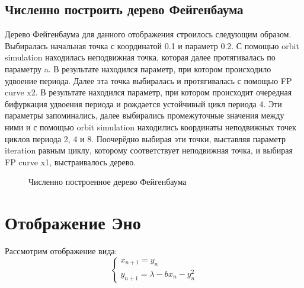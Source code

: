 \documentclass[12pt, a4paper]{article}
\begin{document}
\subsection{Численно построить дерево Фейгенбаума}
Дерево Фейгенбаума для данного отображения строилось следующим образом. Выбиралась начальная точка с координатой 0.1 и параметр 0.2. С помощью orbit simulation находилась неподвижная точка, которая далее протягивалась по параметру a. В результате находился параметр, при котором происходило удвоение периода. Далее эта точка выбиралась и протягивалась с помощью FP curve x2. В результате находился параметр, при котором происходит очередная бифуркация удвоения периода и рождается устойчивый цикл периода 4. Эти параметры запоминались, далее выбирались промежуточные значения между ними и с помощью orbit simulation находились координаты неподвижных точек циклов периода 2, 4 и 8. Поочерёдно выбирая эти точки, выставляя параметр iteration равным циклу, которому соответствует неподвижная точка, и выбирая FP curve x1, выстраивалось дерево.
\begin{figure}[H]
	\caption{Численно построенное дерево Фейгенбаума}
\end{figure}

\section{Отображение Эно}
Рассмотрим отображение вида:
\begin{equation*}
	\begin{cases}
		x_{n + 1} = y_n \\
		y_{n + 1} = \lambda - bx_n - y^2_n
	\end{cases}
\end{equation*}
\end{document}
